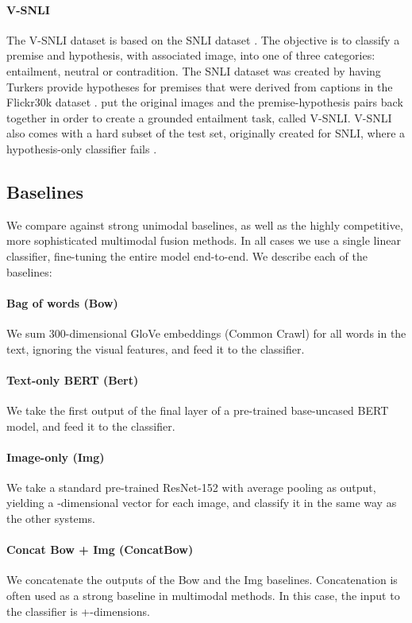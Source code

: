 \documentclass[11pt,a4paper]{article}
\begin{document}
\paragraph{V-SNLI} The V-SNLI dataset is based on the SNLI dataset \cite{Bowman:2015snli}. The objective is to classify a premise and hypothesis, with associated image, into one of three categories: entailment, neutral or contradition. The SNLI dataset was created by having Turkers provide hypotheses for premises that were derived from captions in the Flickr30k dataset \cite{Young:2014flickr30k}. \cite{Vu:2018vsnli} put the original images and the premise-hypothesis pairs back together in order to create a grounded entailment task, called V-SNLI. V-SNLI also comes with a hard subset of the test set, originally created for SNLI, where a hypothesis-only classifier fails \cite{Gururangan:2018arxiv}.

\subsection{Baselines}

We compare against strong unimodal baselines, as well as the highly competitive, more sophisticated multimodal fusion methods. In all cases we use a single linear classifier, fine-tuning the entire model end-to-end. We describe each of the baselines:

\paragraph{Bag of words (Bow)} We sum 300-dimensional GloVe embeddings \cite{Pennington:2014glove} (Common Crawl) for all words in the text, ignoring the visual features, and feed it to the classifier.
\paragraph{Text-only BERT (Bert)} We take the first output of the final layer of a pre-trained base-uncased BERT model, and feed it to the classifier.
\paragraph{Image-only (Img)} We take a standard pre-trained ResNet-152 with average pooling as output, yielding a -dimensional vector for each image, and classify it in the same way as the other systems.
\paragraph{Concat Bow + Img (ConcatBow)} We concatenate the outputs of the Bow and the Img baselines. Concatenation is often used as a strong baseline in multimodal methods. In this case, the input to the classifier is +-dimensions.
\end{document}
